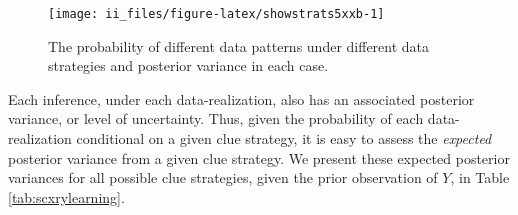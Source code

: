 \documentclass[
  12pt,
]{book}
\begin{document}
\begin{figure}

{\centering \texttt{[image: ii\_files/figure-latex/showstrats5xxb-1]} 

}

\caption{The probability of different data patterns under different data strategies and posterior variance in each case.}\label{fig:showstrats5xxb}
\end{figure}

Each inference, under each data-realization, also has an associated posterior variance, or level of uncertainty. Thus, given the probability of each data-realization conditional on a given clue strategy, it is easy to assess the \emph{expected} posterior variance from a given clue strategy. We present these expected posterior variances for all possible clue strategies, given the prior observation of \(Y\), in Table \ref{tab:scxrylearning}.

\begin{table}

\caption{\label{tab:scxrylearning}Expected learning from different clue selection strategies. Each strategy is a group of nodes on which within case data is gathered.}
\centering
{}
\end{table}
\end{document}

